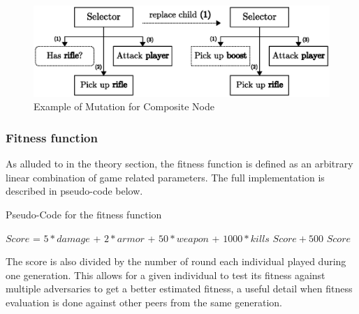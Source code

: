 \documentclass[a4paper, twocolumn]{article}
\begin{document}
        \begin{figure}[H]
            \centering
            \includegraphics[width=\linewidth]{share/child_replacement.eps}
            \caption{Example of Mutation for Composite Node}
            \label{fig:child_replacement}
        \end{figure}

        \subsubsection{Fitness function}
        As alluded to in the theory section, the fitness function is defined as an arbitrary linear combination of game related parameters. The full implementation is described in pseudo-code below.
        \vspace{-0.4em}

        \begin{algorithm}[H]
            \caption{Pseudo-Code for the fitness function}
            \label{alg:fitness_function}
            \begin{algorithmic}
                $Score$ = $5 *damage$ + $2 * armor$ + $50 * weapon$ + $1000 * kills$
                    \RETURN $Score + 500$
                \ELSE
                    \RETURN $Score$
                \ENDIF
            \end{algorithmic}
        \end{algorithm}
        \vspace{-0.6em}

        The score is also divided by the number of round each individual played during one generation. This allows for a given individual to test its fitness against multiple adversaries to get a better estimated fitness, a useful detail when fitness evaluation is done against other peers from the same generation.
\end{document}
